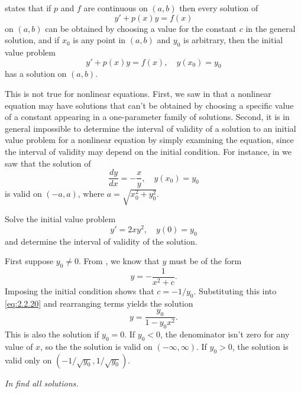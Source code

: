 
 states that if $p$ and $f$ are continuous on
$(a,b)$ then every solution of
\[
y'+p(x)y=f(x)
\]
 on  $(a,b)$  can be obtained by choosing a value for the constant
$c$  in the general solution, and   if
$x_0$ is any point in  $(a,b)$ and $y_0$ is arbitrary, then the
initial value problem
\[
y'+p(x)y=f(x),\quad y(x_0)=y_0
\]
 has a solution on  $(a,b)$.

This is not true for nonlinear equations. First, we
saw in  that a
nonlinear
equation may have solutions that can't be obtained by choosing a
specific value of a constant appearing in a one-parameter family of
solutions. Second, it is in general impossible to determine the
interval of validity of a solution to an initial value problem for a
nonlinear equation by simply examining the equation, since the
interval of validity may depend on the initial condition. For
instance, in  we saw that the solution of
\[
\frac{dy}{dx}=-\frac{x}{y},\quad y(x_0)=y_0
\]
is valid on $(-a,a)$, where $a=\sqrt{x_0^2+y_0^2}$.

\begin{example}\label{example:2.2.6}
Solve the initial value problem
\[
y'=2xy^2, \quad y(0)=y_0
\]
 and determine the  interval of validity of  the solution.
\end{example}


\begin{solution}
First suppose $y_0\ne0$. From
, we know that $y$ must be of the form
\begin{equation} \label{eq:2.2.20}
y=-\frac{1}{x^2+c}.
\end{equation}
 Imposing the initial condition shows  that $c=-1/y_0$.
Substituting this into \eqref{eq:2.2.20} and rearranging terms yields
the solution
\[
y= \frac{y_0}{1-y_0x^2}.
\]
This is also the solution if $y_0=0$. If $y_0<0$,
the denominator isn't  zero for any value of $x$, so the
the solution is valid on $(-\infty,\infty)$. If $y_0>0$, the solution
 is  valid only on $(-1/\sqrt{y_0},1/\sqrt{y_0})$.
\end{solution}

\exercises

\emph{In  find all solutions.}


